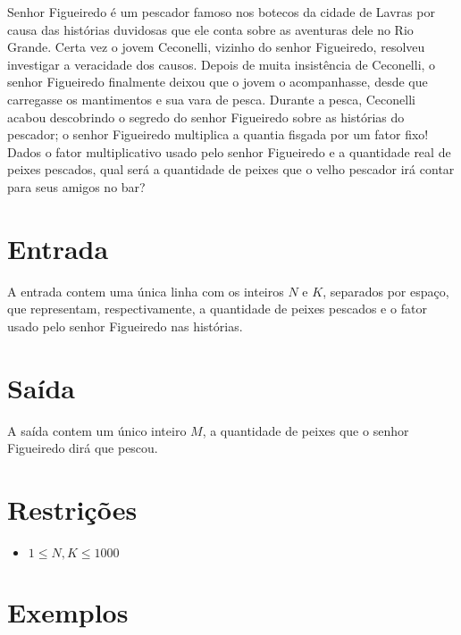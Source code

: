 Senhor Figueiredo é um pescador famoso nos botecos da cidade de Lavras por causa das histórias duvidosas que ele conta sobre as aventuras dele no Rio Grande.
Certa vez o jovem Ceconelli, vizinho do senhor Figueiredo, resolveu investigar a veracidade dos causos.
Depois de muita insistência de Ceconelli, o senhor Figueiredo finalmente deixou que o jovem o acompanhasse, desde que carregasse os mantimentos e sua vara de pesca.
Durante a pesca, Ceconelli acabou descobrindo o segredo do senhor Figueiredo sobre as histórias do pescador; o senhor Figueiredo multiplica a quantia fisgada por um fator fixo!
Dados o fator multiplicativo usado pelo senhor Figueiredo e a quantidade real de peixes pescados, qual será a quantidade de peixes que o velho pescador irá contar para seus amigos no bar?

\section*{Entrada}

A entrada contem uma única linha com os inteiros $N$ e $K$, separados por espaço, que representam, respectivamente, a quantidade de peixes pescados e o fator usado pelo senhor Figueiredo nas histórias.

\section*{Saída}

A saída contem um único inteiro $M$, a quantidade de peixes que o senhor Figueiredo dirá que pescou.

\section*{Restrições}

\begin{itemize}
\item $1 \leq N,K \leq 1000$
\end{itemize}


\section*{Exemplos}

\exemplo


